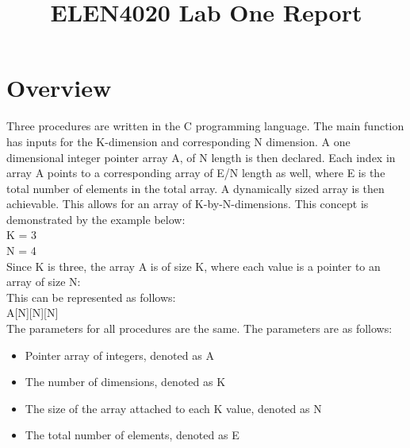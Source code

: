 \documentclass[conference]{IEEEtran}
\begin{document}
%
\title{ELEN4020 Lab One Report}


\author{
}

\maketitle

\IEEEpeerreviewmaketitle



\section{Overview}


Three procedures are written in the C programming language. The main function has inputs for the K-dimension and corresponding N dimension. A one dimensional integer pointer array A, of N length is then declared. Each index in array A points to a corresponding array of E/N length as well, where E is the total number of elements in the total array. A dynamically sized array is then achievable. This allows for an array of K-by-N-dimensions. This concept is demonstrated by the example below:\\

K = 3\\
N = 4\\
Since K is three, the array A is of size K, where each value is a pointer to an array of size N:\\

This can be represented as follows:\\
A[N][N][N]\\

The parameters for all procedures are the same. The parameters are as follows:\\
\begin{itemize}
\item Pointer array of integers, denoted as A
\item The number of dimensions, denoted as K
\item The size of the array attached to each K value, denoted as N
\item The total number of elements, denoted as E\\
\end{itemize}
\end{document}
